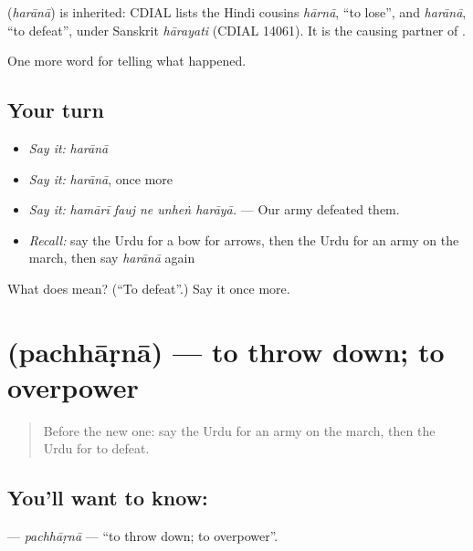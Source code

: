 \begin{cousinweb}
\textbf{} (\emph{harānā}) is inherited: CDIAL lists the Hindi cousins \emph{hārnā}, \textquotedblleft{}to lose\textquotedblright{}, and \emph{harānā}, \textquotedblleft{}to defeat\textquotedblright{}, under Sanskrit \emph{hārayati} (CDIAL 14061). It is the causing partner of \textbf{}.
\end{cousinweb}

\begin{grammarlens}[title={What you've built}]
One more word for telling what happened.
\end{grammarlens}

\subsection*{Your turn}
\begin{itemize}
\raggedright
  \item \emph{Say it:} \emph{harānā}
  \item \emph{Say it:} \emph{harānā}, once more
  \item \emph{Say it:} \emph{hamārī fauj ne unheṅ harāyā.} — Our army defeated them.
  \item \emph{Recall:} say the Urdu for a bow for arrows, then the Urdu for an army on the march, then say \emph{harānā} again
\end{itemize}

\begin{tcolorbox}[breakable,colback=teal!4,colframe=teal!35!black,title={Before you move on}]
What does  mean? (\textquotedblleft{}To defeat\textquotedblright{}.) Say it once more.
\end{tcolorbox}
\section[\texorpdfstring{\ur{پچھاڑنا} (pachhāṛnā)}{پچھاڑنا (pachhāṛnā)}]{ (pachhāṛnā) — to throw down; to overpower}

\label{lesson:UR-C311-pachharna}



\begin{quote}
Before the new one: say the Urdu for an army on the march, then the Urdu for to defeat.
\end{quote}

\subsection*{You'll want to know: }
\textbf{} — \emph{pachhāṛnā} — \textquotedblleft{}to throw down; to overpower\textquotedblright{}.

